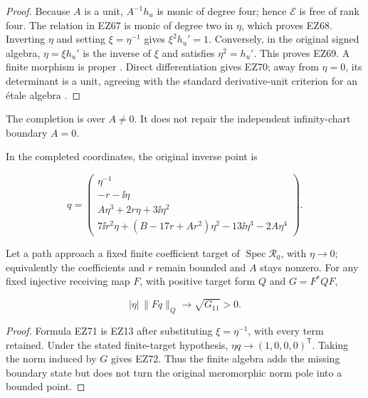 \begin{proof}
Because \(A\) is a unit, \(A^{-1}h_u\) is monic of degree four; hence
\(\mathcal E\) is free of rank four.  The relation in EZ67 is monic of degree
two in \(\eta\), which proves EZ68.  Inverting \(\eta\) and setting
\(\xi=\eta^{-1}\) gives \(\xi^2h_u'=1\).  Conversely, in the original signed
algebra, \(\eta=\xi h_u'\) is the inverse of \(\xi\) and satisfies
\(\eta^2=h_u'\).  This proves EZ69.  A finite morphism is proper
\cite{StacksFinite}.  Direct differentiation gives EZ70; away from
\(\eta=0\), its determinant is a unit, agreeing with the standard
derivative-unit criterion for an étale algebra \cite{StacksEtale}.
\end{proof}

The completion is over \(A\ne0\).  It does not repair the independent
infinity-chart boundary \(A=0\).

\begin{proposition}
\label{prop:retained-pole}
In the completed coordinates, the original inverse point is

\begin{equation}
 q=\begin{pmatrix}
 \eta^{-1}\\
 -r-\ii\eta\\
 A\eta^3+2r\eta+3\ii\eta^2\\
 7\ii r^2\eta+(B-17r+Ar^2)\eta^2-13\ii\eta^3-2A\eta^4
 \end{pmatrix}.                                      \tag{EZ71}
\end{equation}

Let a path approach a fixed finite coefficient target of
\(\operatorname{Spec}\mathcal R_0\), with \(\eta\to0\); equivalently the
coefficients and \(r\) remain bounded and \(A\) stays nonzero.  For any fixed
injective receiving map \(F\), with positive target form \(Q\) and
\(G=F^*QF\),

\begin{equation}
 \boxed{|\eta|\,\|Fq\|_Q\longrightarrow\sqrt{G_{11}}>0.}       \tag{EZ72}
\end{equation}
\end{proposition}

\begin{proof}
Formula EZ71 is EZ13 after substituting \(\xi=\eta^{-1}\), with every term
retained.  Under the stated finite-target hypothesis,
\(\eta q\to(1,0,0,0)^{\mathsf T}\).  Taking the norm induced by \(G\) gives
EZ72.  Thus the finite algebra adds the missing boundary state but does not
turn the original meromorphic norm pole into a bounded point.
\end{proof}

